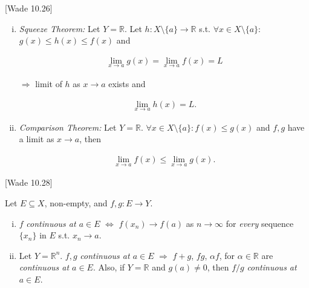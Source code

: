 \documentclass[10pt]{article} %
\newcommand{\cw}[1]{[Wade #1]}
\renewcommand{\leq}{\leqslant}
\begin{document}
\begin{multicols}{3}
\begin{theorem}{\cw{10.26}}{}
\begin{enumerate}[i)]
            \item \emph{Squeeze Theorem:} Let $Y = \mathbb{R}$. Let $h: X \setminus \{a\} \to \mathbb{R}$ s.t. $\forall x \in X \setminus \{a\}:$ $g(x) \leq h(x) \leq f(x)$ and

                \begin{align*}
                    \lim_{x \to a} g(x) = \lim_{x \to a} f(x) = L
                \end{align*}

            $\Rightarrow$ limit of $h$ as $x \to a$ exists and

                \begin{align*}
                    \lim_{x \to a} h(x) = L.
                \end{align*}

            \item \emph{Comparison Theorem:} Let $Y = \mathbb{R}$. $\forall x \in X \setminus \{a\}: f(x) \leq g(x)$ and $f,g$ have a limit as $x \to a$, then

                \begin{align*}
                    \lim_{x \to a} f(x) \leq \lim_{x \to a} g(x).
                \end{align*}
        \end{enumerate}

\end{theorem}

\begin{theorem}{\cw{10.28}}{}

    Let $E \subseteq X$, non-empty, and $f,g : E \to Y$.

        \begin{enumerate}[i)]
            \setlength{\parskip}{0em}
            \item $f$ \emph{continuous at $a \in E$} $\Leftrightarrow$ $f(x_n) \to f(a)$ as $n \to \infty$ for \emph{every} sequence $\{x_n\}$ in $E$ s.t. $x_n \to a$.
            \item Let $Y = \mathbb{R}^n$. $f,g$ \emph{continuous at $a \in E$} $\Rightarrow$ $f + g$, $fg$, $\alpha f$, for $\alpha \in \mathbb{R}$ are \emph{continuous at $a \in E$}. Also, if $Y = \mathbb{R}$ and $g(a) \neq 0$, then $f/g$ \emph{continuous at $a \in E$}.
        \end{enumerate}

\end{theorem}


\end{multicols}
\end{document}
